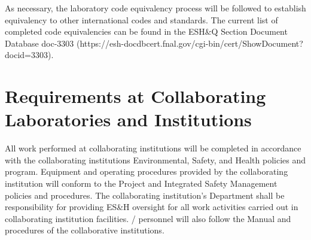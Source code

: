 As necessary, the laboratory code equivalency process will be followed
to establish equivalency to other international codes and
standards. The current list of completed code equivalencies can be
found in the ESH\&Q Section Document Database doc-3303
(https://esh-docdbcert.fnal.gov/cgi-bin/cert/ShowDocument?docid=3303).

\section{ Requirements at Collaborating Laboratories and Institutions}

All work performed at collaborating institutions will be completed in
accordance with the collaborating institutions Environmental, Safety,
and Health policies and program. Equipment and operating procedures
provided by the collaborating institution will conform to the 
Project  and Integrated Safety Management policies and
procedures. The collaborating institution's  Department shall be
responsibility for providing ES\&H oversight for all work activities
carried out in collaborating institution facilities. /
personnel will also follow the  Manual and procedures of the
collaborative institutions.
